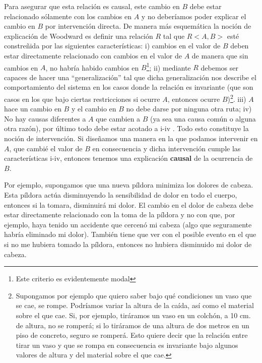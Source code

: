 Para asegurar que esta relación es causal, este cambio en $B$ debe estar relacionado sólamente con los cambios en $A$ y no deberíamos poder explicar el cambio en $B$ por intervención directa. De manera más esquemática la noción de explicación de Woodward es definir una relación $R$ tal que $R<A, B>$ esté constreñida por las siguientes características: i) cambios en el valor de $B$ deben estar directamente relacionado con cambios en el valor de $A$ de manera que sin cambios en $A$, no habría habido cambios en $B$\footnote{Este criterio es evidentemente modal}; ii) mediante $R$ debemos ser capaces de hacer una ``generalización'' tal que dicha generalización nos describe el comportamiento del sistema en los casos donde la relación es invariante (que son casos en los que bajo ciertas restricciones si ocurre $A$, entonces ocurre $B$)\footnote{Supongamos por ejemplo que quiero saber bajo qué condiciones un vaso que se cae, se rompe. Podríamos variar la altura de la caída, así como el material sobre el que cae. Si, por ejemplo, tiráramos un vaso en un colchón, a 10 cm. de altura, no se romperá; si lo tiráramos de una altura de dos metros en un piso de concreto, seguro se romperá. Esto quiere decir que la relación entre tirar un vaso y que se rompa en consecuencia es invariante bajo algunos valores de altura y del material sobre el que cae.}.  iii) $A$ hace un cambio en $B$ y el cambio en $B$ no debe darse por ninguna otra ruta; iv) No hay causas diferentes a $A$ que cambien a $B$ (ya sea una causa común o alguna otra razón), por último todo debe estar acotado a i-iv \cite[p. 201]{Woodward2000}. Todo esto constituye la noción de intervención. Si diseñamos una manera en la que podamos intervenir en $A$, que cambié el valor de $B$ en consecuencia y dicha intervención cumple las características i-iv, entonces tenemos una explicación \textbf{causal} de la ocurrencia de $B$.

Por ejemplo, supongamos que una nueva píldora minimiza los dolores de cabeza. Esta píldora actúa disminuyendo la sensibilidad de dolor en todo el cuerpo, entonces si la tomara, disminuirá mi dolor. El cambio en el dolor de cabeza debe estar directamente relacionado con la toma de la píldora y no con que, por ejemplo, haya tenido un accidente que cercenó mi cabeza (algo que seguramente habría eliminado mi dolor). También tiene que ver con el posible evento en el que si no me hubiera tomado la píldora, entonces no hubiera disminuido mi dolor de cabeza.

